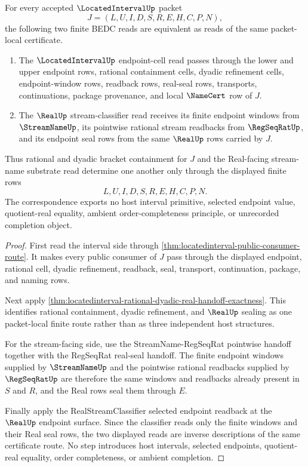 \begin{theorem}
\label{thm:located-interval-real-stream-bracket-correspondence}
For every accepted $\LocatedIntervalUp$ packet
$$
J=(L,U,I,D,S,R,E,H,C,P,N),
$$
the following two finite BEDC reads are equivalent as reads of the same packet-local certificate.
\begin{enumerate}
\item The $\LocatedIntervalUp$ endpoint-cell read passes through the lower and upper endpoint rows, rational containment cells, dyadic refinement cells, endpoint-window rows, readback rows, real-seal rows, transports, continuations, package provenance, and local $\NameCert$ row of $J$.
\item The $\RealUp$ stream-classifier read receives its finite endpoint windows from $\StreamNameUp$, its pointwise rational stream readbacks from $\RegSeqRatUp$, and its endpoint seal rows from the same $\RealUp$ rows carried by $J$.
\end{enumerate}
Thus rational and dyadic bracket containment for $J$ and the Real-facing stream-name substrate read determine one another only through the displayed finite rows
$$
L,U,I,D,S,R,E,H,C,P,N.
$$
The correspondence exports no host interval primitive, selected endpoint value, quotient-real equality, ambient order-completeness principle, or unrecorded completion object.
\end{theorem}
\begin{proof}
First read the interval side through \autoref{thm:locatedinterval-public-consumer-route}. It makes every public consumer of $J$ pass through the displayed endpoint, rational cell, dyadic refinement, readback, seal, transport, continuation, package, and naming rows.

Next apply \autoref{thm:locatedinterval-rational-dyadic-real-handoff-exactness}. This identifies rational containment, dyadic refinement, and $\RealUp$ sealing as one packet-local finite route rather than as three independent host structures.

For the stream-facing side, use the StreamName-RegSeqRat pointwise handoff together with the RegSeqRat real-seal handoff. The finite endpoint windows supplied by $\StreamNameUp$ and the pointwise rational readbacks supplied by $\RegSeqRatUp$ are therefore the same windows and readbacks already present in $S$ and $R$, and the Real rows seal them through $E$.

Finally apply the RealStreamClassifier selected endpoint readback at the $\RealUp$ endpoint surface. Since the classifier reads only the finite windows and their Real seal rows, the two displayed reads are inverse descriptions of the same certificate route. No step introduces host intervals, selected endpoints, quotient-real equality, order completeness, or ambient completion.
\end{proof}


